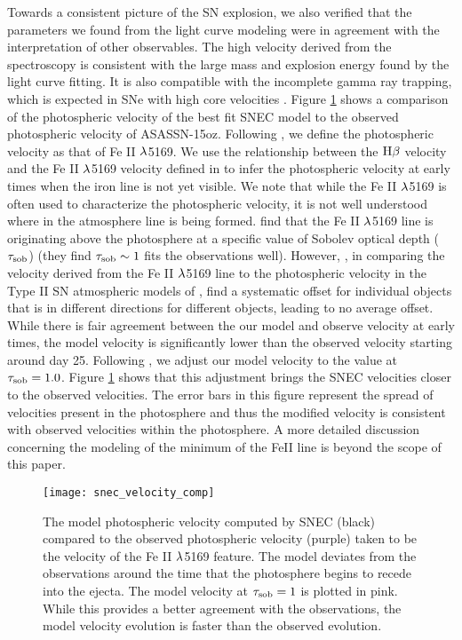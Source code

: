 \documentclass[a4paper,fleqn,usenatbib]{mnras}
\begin{document}
Towards a consistent picture of the SN explosion, we also verified that the parameters we found from the light curve modeling were in agreement with the interpretation of other observables.
The high velocity derived from the spectroscopy is consistent with the large mass and explosion energy found by the light curve fitting.
It is also compatible with the incomplete gamma ray trapping, which is expected in SNe with high core velocities \citep{2011jerkstrand}.
Figure \ref{fig:SNECVelocityCompare} shows a comparison of the photospheric velocity of the best fit SNEC model to the observed photospheric velocity of ASASSN-15oz.
Following \citet{2014faran}, we define the photospheric velocity as that of Fe II $\rm{\lambda}$5169. 
We use the relationship between the $\rm{H\beta}$ velocity and the Fe II $\rm{\lambda}$5169 velocity defined in \citet{2014faran} to infer the photospheric velocity at early times when the iron line is not yet visible.
We note that while the Fe II $\rm{\lambda}$5169 is often used to characterize the photospheric velocity, it is not well understood where in the atmosphere line is being formed. 
\citet{2018paxton} find that the Fe II $\rm{\lambda}$5169 line is originating above the photosphere at a specific value of Sobolev optical depth ($\rm{\tau_{sob}}$) (they find $\rm{\tau_{sob} \sim1}$ fits the observations well).
However, \citet{2001hamuy}, in comparing the velocity derived from the Fe II $\rm{\lambda}$5169 line to the photospheric velocity in the Type II SN atmospheric models of \citet{1996eastman}, find a systematic offset for individual objects that is in different directions for different objects, leading to no average offset. 
While there is fair agreement between the our model and observe velocity at early times, the model velocity is significantly lower than the observed velocity starting around day 25.
Following \citet{2018paxton}, we adjust our model velocity to the value at $\rm{\tau_{sob} = 1.0}$. 
Figure \ref{fig:SNECVelocityCompare} shows that this adjustment brings the SNEC velocities closer to the observed velocities.
The error bars in this figure represent the spread of velocities present in the photosphere and thus the modified velocity is consistent with observed velocities within the photosphere. 
A more detailed discussion concerning the modeling of the minimum of the FeII line is beyond the scope of this paper.
\begin{figure}
\begin{center}
\texttt{[image: snec\_velocity\_comp]} %
\caption{The model photospheric velocity computed by SNEC (black) compared to the observed photospheric velocity (purple) taken to be the velocity of the Fe II $\rm{\lambda}$5169 feature. 
The model deviates from the observations around the time that the photosphere begins to recede into the ejecta.
The model velocity at $\rm{\tau_{sob}=1}$ is plotted in pink. 
While this provides a better agreement with the observations, the model velocity evolution is faster than the observed evolution.
}
\label{fig:SNECVelocityCompare}
\end{center}
\end{figure}
\end{document}
